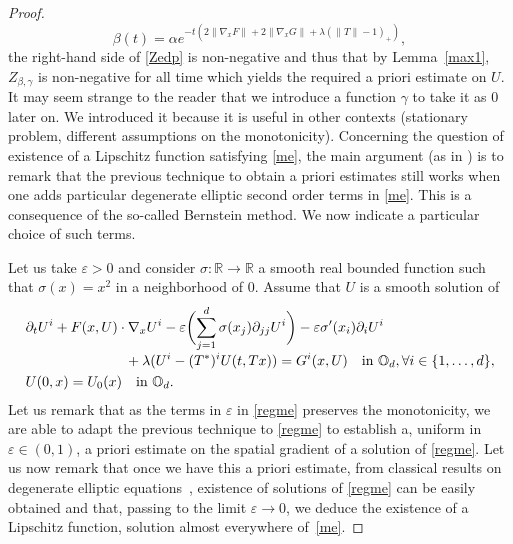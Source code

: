 \documentclass[JEP,XML,SOM,Unicode,NoEqCountersInSection,published]{cedram}
\let\epsilon\varepsilon
\theoremstyle{definition}
\begin{document}
\begin{proof}
\begin{equation*}
\beta(t) = \alpha e^{-t(2\|\nabla_x F\|+2 \|\nabla_x G\|+\lambda(\|T\| -1)_+)},
\end{equation*}
the right-hand side of \eqref{Zedp} is non-negative and thus that by Lemma~\ref{max1}, $Z_{\beta,\gamma}$ is non-negative for all time which yields the required a priori estimate on $U$. It may seem strange to the reader that we introduce a function $\gamma$ to take it as $0$ later on. We introduced it because it is useful in other contexts (stationary problem, different assumptions on the monotonicity).
Concerning the question of existence of a Lipschitz function satisfying \eqref{me}, the main argument (as in \cite{lions2007cours}) is to remark that the previous technique to obtain a priori estimates still works when one adds particular degenerate elliptic second order terms in \eqref{me}. This is a consequence of the so-called Bernstein method. We now indicate a particular choice of such terms.

Let us take $\epsilon > 0$ and consider $\sigma: \mathbb{R} \to \mathbb{R}$ a smooth real bounded function such that $\sigma (x) = x^2$ in a neighborhood of $0$. Assume that $U$ is a smooth solution of
\begin{equation}\label{regme}
\begin{split}
&\partial_t U^i+F(x,U) \cdot \nabla_x U^i-\epsilon \biggl(\sum_{j=1}^d \sigma(x_j)\partial_{jj}U^i\biggr)-\epsilon \sigma'(x_i)\partial_i U^i\\[-3pt]
&\hspace*{2.5cm}+\lambda (U^i-(T^*)^iU(t,Tx)) = G^i(x,U) \quad\text{in } \mathbb{O}_d, \forall i \in \{1,\dots,d\},\\
&U(0,x) = U_0(x)  \quad\text{in } \mathbb{O}_d.
\end{split}
\end{equation}
Let us remark that as the terms in $\epsilon$ in \eqref{regme} preserves the monotonicity, we are able to adapt the previous technique to \eqref{regme} to establish a, uniform in $\epsilon \in (0,1)$, a priori estimate on the spatial gradient of a solution of \eqref{regme}. Let us now remark that once we have this a priori estimate, from classical results on degenerate elliptic equations~\cite{oleinik2012second}, existence of solutions of \eqref{regme} can be easily obtained and that, passing to the limit $\epsilon \to 0$, we deduce the existence of a Lipschitz function, solution almost everywhere of~\eqref{me}.
\end{proof}
\end{document}
